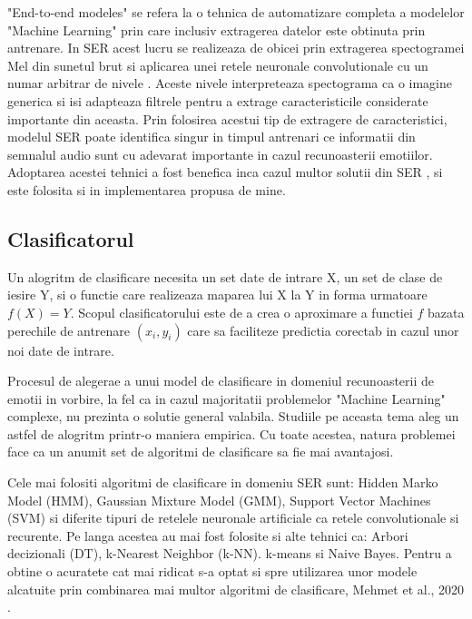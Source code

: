 \documentclass[a4paper,12pt]{book}
\begin{document}
						"End-to-end modeles" se refera la o tehnica de automatizare completa a modelelor "Machine Learning" prin care inclusiv extragerea datelor este obtinuta prin antrenare. In SER acest lucru se realizeaza de obicei prin extragerea spectogramei Mel din sunetul brut si aplicarea unei retele neuronale convolutionale cu un numar arbitrar de nivele \cite{graves,tzir}. Aceste nivele interpreteaza spectograma ca o imagine generica si isi adapteaza filtrele pentru a extrage caracteristicile considerate importante din aceasta. Prin folosirea acestui tip de extragere de caracteristici, modelul SER poate identifica singur in timpul antrenari ce informatii din semnalul audio sunt cu adevarat importante in cazul recunoasterii emotiilor. Adoptarea acestei tehnici a fost benefica inca cazul multor solutii din SER \cite{graves, tzir, zhang, yuan, adieu, e2e}, si este folosita si in implementarea propusa de mine.
					\subsection{Clasificatorul}
						Un alogritm de clasificare necesita un set date de intrare X, un set de clase de iesire Y, si o functie care realizeaza maparea lui X la Y in forma urmatoare \(f(X)=Y\). Scopul clasificatorului este de a crea o aproximare a functiei \(f\) bazata perechile de antrenare $(x_i,y_i)$ care sa faciliteze predictia corectab in cazul unor noi date de intrare. \par
						
						Procesul de alegerae a unui model de clasificare in domeniul recunoasterii de emotii in vorbire, la fel ca in cazul majoritatii problemelor "Machine Learning" complexe, nu prezinta o solutie general valabila. Studiile pe aceasta tema aleg un astfel de alogritm printr-o maniera empirica. Cu toate acestea, natura problemei face ca un anumit set de algoritmi de clasificare sa fie mai avantajosi.\par 
						Cele mai folositi algoritmi de clasificare in domeniu SER sunt: Hidden Marko Model (HMM), Gaussian Mixture Model (GMM), Support Vector Machines (SVM) si diferite tipuri de retelele neuronale artificiale ca retele convolutionale si recurente. Pe langa acestea au mai fost folosite si alte tehnici ca: Arbori decizionali (DT), k-Nearest Neighbor (k-NN). k-means si Naive Bayes. Pentru a obtine o acuratete cat mai ridicat s-a optat si spre utilizarea unor modele alcatuite prin combinarea mai multor algoritmi de clasificare, Mehmet et al., 2020 \cite{mehmet}.
						
\end{document}
